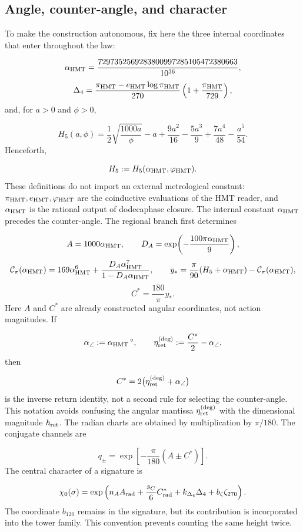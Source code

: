 \subsection{Angle, counter-angle, and character}
To make the construction autonomous, fix here the three internal coordinates that enter throughout the law:

\[
\alpha_{\rm HMT}
=\frac{7297352569283800997285105472380663}{10^{36}},
\]
\[
\Delta_4
=\frac{\pi_{\rm HMT}-e_{\rm HMT}\log\pi_{\rm HMT}}{270}
\left(1+\frac{\pi_{\rm HMT}}{729}\right),
\]
and, for \(a>0\) and \(\phi>0\),

\[
H_5(a,\phi)
=\frac12\sqrt{\frac{1000a}{\phi}}-a
+\frac{9a^2}{16}-\frac{5a^3}{9}
+\frac{7a^4}{48}-\frac{a^5}{54}.
\]
Henceforth,

\[
H_5:=H_5(\alpha_{\rm HMT},\varphi_{\rm HMT}).
\]
These definitions do not import an external metrological constant: \(\pi_{\rm HMT},e_{\rm HMT},\varphi_{\rm HMT}\) are the coinductive evaluations of the HMT reader, and \(\alpha_{\rm HMT}\) is the rational output of dodecaphase closure. The internal constant \(\alpha_{\rm HMT}\) precedes the counter-angle. The regional branch first determines

\[
A=1000\alpha_{\rm HMT},
\qquad
D_A=\exp\!\left(-\frac{100\pi\alpha_{\rm HMT}}9\right),
\]
\[
\mathcal C_\pi(\alpha_{\rm HMT})
=169\alpha_{\rm HMT}^{6}
+\frac{D_A\alpha_{\rm HMT}^{7}}
       {1-D_A\alpha_{\rm HMT}},
\qquad
y_*=\frac{\pi}{90}(H_5+\alpha_{\rm HMT})
-\mathcal C_\pi(\alpha_{\rm HMT}),
\]
\[
C^*=\frac{180}{\pi}y_*.
\]
Here \(A\) and \(C^*\) are already constructed angular coordinates, not action magnitudes. If

\[
\alpha_\angle:=\alpha_{\rm HMT}\,{}^\circ,
\qquad
\eta_{\rm ret}^{(\deg)}:=\frac{C^*}{2}-\alpha_\angle,
\]
then

\[
C^*=2\bigl(\eta_{\rm ret}^{(\deg)}+\alpha_\angle\bigr)
\]
is the inverse return identity, not a second rule for selecting the counter-angle. This notation avoids confusing the angular mantissa \(\eta_{\rm ret}^{(\deg)}\) with the dimensional magnitude \(\hbar_{\rm ret}\). The radian charts are obtained by multiplication by \(\pi/180\). The conjugate channels are

\[
q_\pm=\exp\left[-\frac\pi{180}(A\pm C^*)\right].
\]
The central character of a signature is

\[
\chi_0(\sigma)=
\exp\left(
n_AA_{\rm rad}
+\frac{s_C}{6}C^*_{\rm rad}
+k_{\Delta_4}\Delta_4
+b_\zeta\zeta_{270}
\right).
\]
The coordinate \(b_{120}\) remains in the signature, but its contribution is incorporated into the tower family. This convention prevents counting the same height twice.

